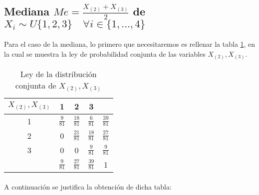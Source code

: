 \documentclass{article}
\begin{document}
    \subsection{Mediana $Me = \frac{X_{(2)} + X_{(3)}}{2}$ de $X_i \sim U\{1,2,3\} \quad \forall i  \in \{1,...,4\}$}

      \paragraph{}
      Para el caso de la mediana, lo primero que necesitaremos es rellenar la tabla \ref{table:joint_2_3}, en la cual se muestra la ley de probabilidad conjunta de las variables $X_{(2)},X_{(3)}$.

      \begin{table}[H]
        \centering
        \begin{tabular}{c | c  c  c | c}
          $X_{(2)},X_{(3)}$ & 1               & 2               & 3               &                 \\ \hline
          1                 & $\frac{9}{81}$  & $\frac{18}{81}$ & $\frac{6}{81}$  &$\frac{39}{81}$  \\
          2                 & 0               & $\frac{21}{81}$ & $\frac{18}{81}$ & $\frac{27}{81}$ \\
          3                 & 0               & 0               & $\frac{9}{81}$  & $\frac{9}{81}$  \\ \hline
                            & $\frac{9}{81}$  & $\frac{27}{81}$ & $\frac{39}{81}$ & 1
        \end{tabular}
        \caption{Ley de la distribución conjunta de $X_{(2)},X_{(3)}$}
        \label{table:joint_2_3}
      \end{table}

      \paragraph{}
      A continuación se justifica la obtención de dicha tabla:
\end{document}
